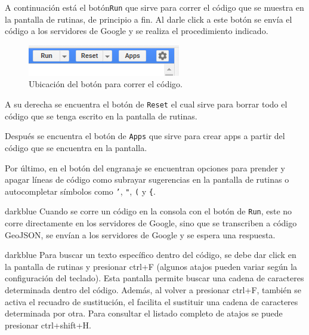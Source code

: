 \documentclass[
  12pt,
  letterpaper,
  twoside]{book}
\begin{document}
A continuación está el botón\texttt{Run} que sirve para correr el código que se muestra en la pantalla de rutinas, de principio a fin. Al darle click a este botón se envía el código a los servidores de Google y se realiza el procedimiento indicado.

\begin{figure}

{\centering \includegraphics[width=0.3\linewidth]{Img/run} 

}

\caption{Ubicación del botón para correr el código.}\label{fig:unnamed-chunk-17}
\end{figure}

A su derecha se encuentra el botón de \texttt{Reset} el cual sirve para borrar todo el código que se tenga escrito en la pantalla de rutinas.

Después se encuentra el botón de \texttt{Apps} que sirve para crear apps a partir del código que se encuentra en la pantalla.

Por último, en el botón del engranaje se encuentran opciones para prender y apagar líneas de código como subrayar sugerencias en la pantalla de rutinas o autocompletar símbolos como \texttt{’}, \texttt{"}, \texttt{(} y \texttt{\{}.

\begin{bluebox2}

\begin{awesomeblock}{5pt}{\faLightbulb}{darkblue}
Cuando se corre un código en la consola con el botón de \texttt{Run}, este no corre directamente en los servidores de Google, sino que se transcriben a código GeoJSON, se envían a los servidores de Google y se espera una respuesta.

\end{awesomeblock}

\end{bluebox2}

\begin{bluebox2}

\begin{awesomeblock}{5pt}{\faLightbulb}{darkblue}
Para buscar un texto específico dentro del código, se debe dar click en la pantalla de rutinas y presionar ctrl+F (algunos atajos pueden variar según la configuración del teclado). Esta pantalla permite buscar una cadena de caracteres determinada dentro del código. Además, al volver a presionar ctrl+F, también se activa el recuadro de sustitución, el facilita el sustituir una cadena de caracteres determinada por otra. Para consultar el listado completo de atajos se puede presionar ctrl+shift+H.

\end{awesomeblock}

\end{bluebox2}
\end{document}
